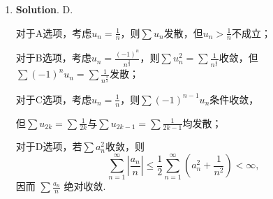 \documentclass[../Main.tex]{subfiles}
\begin{document}
\begin{enumerate}
        C、D均满足 \(P_y=\dfrac1{y^2}\)，但$P=\frac{1}{x}-\frac{1}{y}$在$x=0$处无定义，故选C.

  \item \textbf{Solution}. D.

        对于A选项，考虑$u_n=\frac{1}{n}$，则$\sum u_n$发散，但$u_n>\frac{1}{n}$不成立；

        对于B选项，考虑$u_n=\frac{(-1)^{n}}{n^{\frac{2}{3}}}$，则$\sum u_n^2=\sum \frac{1}{n^{\frac{4}{3}}}$收敛，但$\sum (-1)^n u_n=\sum \frac{1}{n^{\frac{2}{3}}}$发散；

        对于C选项，考虑$u_n=\frac{1}{n}$，则$\sum (-1)^{n-1}u_n$条件收敛，

        但$\sum u_{2k}=\sum \frac{1}{2k}$与$\sum u_{2k-1}=\sum \frac{1}{2k-1}$均发散；

        对于D选项，若$\sum a_n^2$收敛，则
        \[
          \sum_{n=1}^{\infty}\left|\frac{a_n}{n}\right|
          \le \frac{1}{2}\sum_{n=1}^{\infty}\left(a_n^2+\frac{1}{n^2}\right) < \infty,
        \]
        因而 \(\sum \frac{a_n}{n}\) 绝对收敛.
\end{enumerate}
\end{document}
